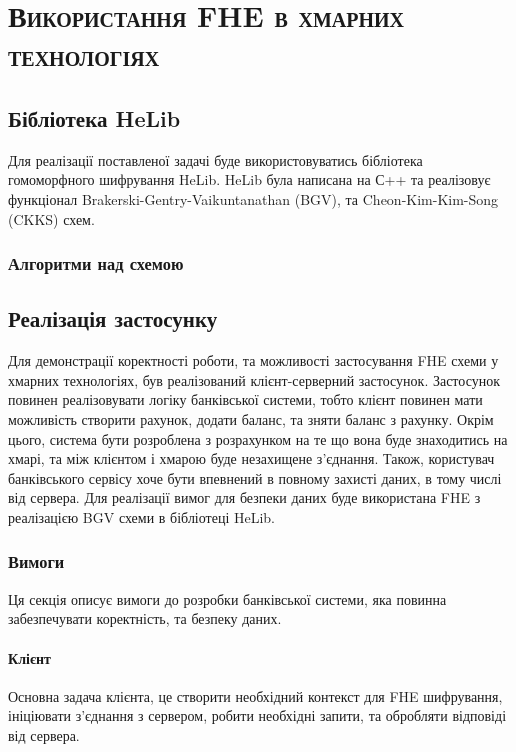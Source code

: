 \newpage

\chapter{\textsc{Використання FHE в хмарних технологіях}}

\section{Бібліотека HeLib}
Для реалізації поставленої задачі буде використовуватись бібліотека гомоморфного шифрування
HeLib. HeLib була написана на С++ та реалізовує функціонал  Brakerski-Gentry-Vaikuntanathan 
(BGV), та Cheon-Kim-Kim-Song (CKKS) схем.

\subsection{Алгоритми над схемою}




\section{Реалізація застосунку}
Для демонстрації коректності роботи, та можливості застосування FHE схеми у хмарних 
технологіях, був реалізований клієнт-серверний застосунок. Застосунок повинен реалізовувати
логіку банківської системи, тобто клієнт повинен мати можливість створити рахунок,
додати баланс, та зняти баланс з рахунку. Окрім цього, система бути розроблена з розрахунком
на те що вона буде знаходитись на хмарі, та між клієнтом і хмарою буде незахищене з'єднання.
Також, користувач банківського сервісу хоче бути впевнений в повному захисті даних, в тому
числі від сервера. Для реалізації вимог для безпеки даних буде використана FHE з реалізацією
BGV схеми в бібліотеці HeLib.

\subsection{Вимоги}
Ця секція описує вимоги до розробки банківської системи, яка повинна забезпечувати коректність,
та безпеку даних.
\subsubsection*{Клієнт}
Основна задача клієнта, це створити необхідний контекст для FHE шифрування, ініціювати
з'єднання з сервером, робити необхідні запити, та обробляти відповіді від сервера.

